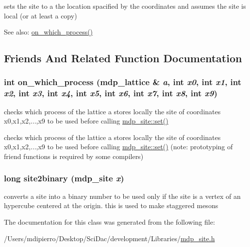 sets the site to a the location spacified by the coordinates and assumes the site is local (or at least a copy) \begin{Desc}
\item[See also:]\hyperlink{classmdp__site_c96405ecdb78dc33d55edea04876a931}{on\_\-which\_\-process()} \end{Desc}


\subsection{Friends And Related Function Documentation}
\hypertarget{classmdp__site_c96405ecdb78dc33d55edea04876a931}{
\subsubsection[{on\_\-which\_\-process}]{\setlength{\rightskip}{0pt plus 5cm}int on\_\-which\_\-process ({\bf mdp\_\-lattice} \& {\em a}, \/  int {\em x0}, \/  int {\em x1}, \/  int {\em x2}, \/  int {\em x3}, \/  int {\em x4}, \/  int {\em x5}, \/  int {\em x6}, \/  int {\em x7}, \/  int {\em x8}, \/  int {\em x9})}}
\label{classmdp__site_c96405ecdb78dc33d55edea04876a931}


checks which process of the lattice a stores locally the site of coordinates x0,x1,x2,...,x9 to be used before calling \hyperlink{classmdp__site_241eb259576cbe7354d1ff714d22416c}{mdp\_\-site::set()}

checks which process of the lattice a stores locally the site of coordinates x0,x1,x2,...,x9 to be used before calling \hyperlink{classmdp__site_241eb259576cbe7354d1ff714d22416c}{mdp\_\-site::set()} (note: prototyping of friend functions is required by some compilers) \hypertarget{classmdp__site_67b8c8b4e357e454748fefb8d136ac0e}{
\subsubsection[{site2binary}]{\setlength{\rightskip}{0pt plus 5cm}long site2binary ({\bf mdp\_\-site} {\em x})}}
\label{classmdp__site_67b8c8b4e357e454748fefb8d136ac0e}


converts a site into a binary number to be used only if the site is a vertex of an hypercube centered at the origin. this is used to make staggered mesons 

The documentation for this class was generated from the following file:\begin{CompactItemize}
\item 
/Users/mdipierro/Desktop/SciDac/development/Libraries/\hyperlink{mdp__site_8h}{mdp\_\-site.h}\end{CompactItemize}
